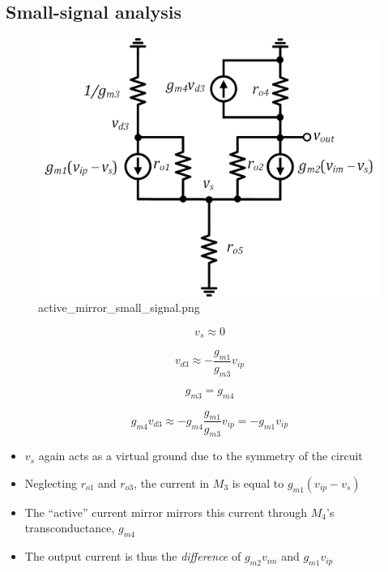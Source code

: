 \documentclass[11pt]{article}
\providecommand{\tightlist}{%
      \setlength{\itemsep}{0pt}\setlength{\parskip}{0pt}}
\begin{document}
    \hypertarget{small-signal-analysis}{%
\subsection{Small-signal analysis}\label{small-signal-analysis}}

    \begin{figure}
\centering
\includegraphics{active_mirror_small_signal.png}
\caption{active\_mirror\_small\_signal.png}
\end{figure}

    \begin{equation}
v_s \approx 0
\end{equation}

\begin{equation}
v_{d3} \approx -\dfrac{g_{m1}}{g_{m3}}v_{ip}
\end{equation}

\begin{equation}
g_{m3} = g_{m4}
\end{equation}

\begin{equation}
\boxed{g_{m4}v_{d3} \approx -g_{m4}\dfrac{g_{m1}}{g_{m3}}v_{ip} = -g_{m1}v_{ip}}
\end{equation}

    \begin{itemize}
\tightlist
\item
  \(v_s\) again acts as a virtual ground due to the symmetry of the
  circuit
\item
  Neglecting \(r_{o1}\) and \(r_{o3}\), the current in \(M_3\) is equal
  to \(g_{m1} (v_{ip} - v_s)\)
\item
  The ``active'' current mirror mirrors this current through \(M_4\)'s
  transconductance, \(g_{m4}\)
\item
  The output current is thus the \emph{difference} of \(g_{m2}v_{im}\)
  and \(g_{m1}v_{ip}\)
\end{itemize}
\end{document}
